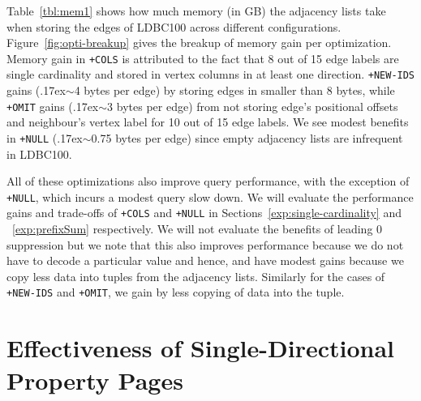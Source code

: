 Table~\ref{tbl:mem1} shows how much memory (in GB) the adjacency lists take when storing the edges of LDBC100 across different configurations.  Figure~\ref{fig:opti-breakup} gives the breakup of memory gain per optimization. Memory gain in \texttt{+COLS} is attributed to the fact that 8 out of 15 edge labels are single cardinality and stored in vertex columns in at least one direction. \texttt{+NEW-IDS} gains ({\raise.17ex\hbox{$\scriptstyle\sim$}}4 bytes per edge) by storing edges in smaller than 8 bytes, while \texttt{+OMIT} gains ({\raise.17ex\hbox{$\scriptstyle\sim$}}3 bytes per edge) from not storing edge's positional offsets and neighbour's vertex label for 10 out of 15 edge labels. We see modest benefits in \texttt{+NULL} ({\raise.17ex\hbox{$\scriptstyle\sim$}}0.75 bytes per edge) since empty adjacency lists are infrequent in LDBC100.

All of these optimizations also improve query performance, with the exception of \texttt{+NULL}, which incurs a modest query slow down. We will evaluate the performance gains and trade-offs of \texttt{+COLS} and \texttt{+NULL} in Sections~\ref{exp:single-cardinality} and ~\ref{exp:prefixSum} respectively. 
We will not evaluate the benefits of leading 0 suppression but we note that this also improves performance because we do not have to decode a particular value and hence, and have modest gains because we copy less data into tuples from the adjacency lists. Similarly for the cases of \texttt{+NEW-IDS} and \texttt{+OMIT}, we gain by less copying of data into the tuple.


\section{Effectiveness of Single-Directional Property Pages}
\label{exp:property-pages}

